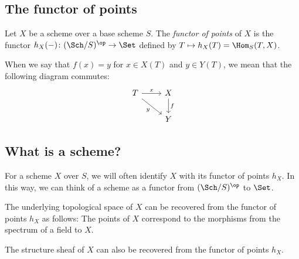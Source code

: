 \subsection{The functor of points}

    Let \(X\) be a scheme over a base scheme \(S\).
    The \emph{functor of points} of \(X\) is the functor \(h_X(-)\colon (\Sch/S)^{\op} \to \Set\) defined by \(T \mapsto h_X(T) = \Hom_S(T, X)\).

    When we say that \(f(x) = y\) for \(x \in X(T)\) and \(y \in Y(T)\), we mean that the following diagram commutes:
    \[\begin{tikzcd}
        T \arrow[r, "x"] \arrow[rd, "y"'] & X \arrow[d, "f"] \\
                                           & Y
    \end{tikzcd}\]

\subsection{What is a scheme?}

    For a scheme \(X\) over \(S\), we will often identify \(X\) with its functor of points \(h_X\).
    In this way, we can think of a scheme as a functor from \((\Sch/S)^{\op}\) to \(\Set\).

    The underlying topological space of \(X\) can be recovered from the functor of points \(h_X\) as follows:
    The points of \(X\) correspond to the morphisms from the spectrum of a field to \(X\).

    The structure sheaf of \(X\) can also be recovered from the functor of points \(h_X\).



